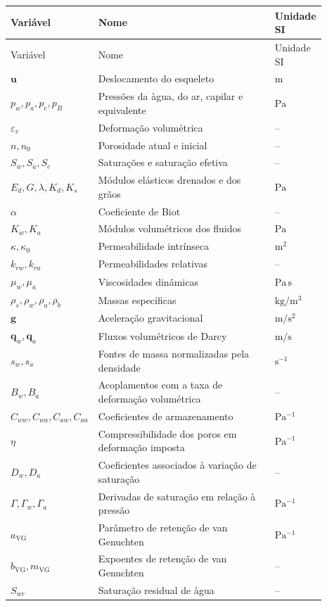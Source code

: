 \documentclass[11pt,a4paper]{article}
\numberwithin{equation}{section}
\begin{document}
\begin{longtable}{>{\raggedright\arraybackslash}p{0.19\linewidth}
                  >{\raggedright\arraybackslash}p{0.58\linewidth}
                  >{\raggedright\arraybackslash}p{0.12\linewidth}}
\toprule
Vari\'avel & Nome & Unidade SI\\
\midrule
\endfirsthead
\toprule
Vari\'avel & Nome & Unidade SI\\
\midrule
\endhead
$\mathbf u$ & Deslocamento do esqueleto & $\mathrm m$\\
$p_w,p_a,p_c,p_B$ & Press\~oes da \`agua, do ar, capilar e equivalente & $\mathrm{Pa}$\\
$\varepsilon_v$ & Deforma\c{c}\~ao volum\'etrica & --\\
$n,n_0$ & Porosidade atual e inicial & --\\
$S_w,S_a,S_e$ & Satura\c{c}\~oes e satura\c{c}\~ao efetiva & --\\
$E_d,G,\lambda,K_d,K_s$ & M\'odulos el\'asticos drenados e dos gr\~aos & $\mathrm{Pa}$\\
$\alpha$ & Coeficiente de Biot & --\\
$K_w,K_a$ & M\'odulos volum\'etricos dos fluidos & $\mathrm{Pa}$\\
$\kappa,\kappa_0$ & Permeabilidade intr\'inseca & $\mathrm{m^2}$\\
$k_{rw},k_{ra}$ & Permeabilidades relativas & --\\
$\mu_w,\mu_a$ & Viscosidades din\^amicas & $\mathrm{Pa\,s}$\\
$\rho_s,\rho_w,\rho_a,\rho_b$ & Massas espec\'ificas & $\mathrm{kg/m^3}$\\
$\mathbf g$ & Acelera\c{c}\~ao gravitacional & $\mathrm{m/s^2}$\\
$\mathbf q_w,\mathbf q_a$ & Fluxos volum\'etricos de Darcy & $\mathrm{m/s}$\\
$s_w,s_a$ & Fontes de massa normalizadas pela densidade & $\mathrm{s^{-1}}$\\
$B_w,B_a$ & Acoplamentos com a taxa de deforma\c{c}\~ao volum\'etrica & --\\
$C_{ww},C_{wa},C_{aw},C_{aa}$ & Coeficientes de armazenamento & $\mathrm{Pa^{-1}}$\\
$\eta$ & Compressibilidade dos poros em deforma\c{c}\~ao imposta & $\mathrm{Pa^{-1}}$\\
$D_w,D_a$ & Coeficientes associados \`a varia\c{c}\~ao de satura\c{c}\~ao & --\\
$\Gamma,\Gamma_w,\Gamma_a$ & Derivadas de satura\c{c}\~ao em rela\c{c}\~ao \`a press\~ao & $\mathrm{Pa^{-1}}$\\
$a_{\mathrm{VG}}$ & Par\^ametro de reten\c{c}\~ao de van Genuchten & $\mathrm{Pa^{-1}}$\\
$b_{\mathrm{VG}},m_{\mathrm{VG}}$ & Expoentes de reten\c{c}\~ao de van Genuchten & --\\
$S_{wr}$ & Satura\c{c}\~ao residual de \`agua & --\\
\bottomrule
\end{longtable}
\end{document}
